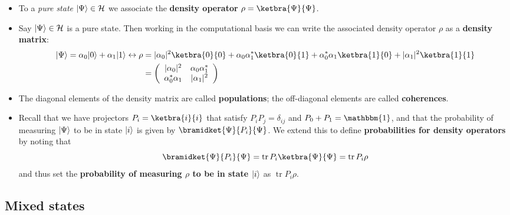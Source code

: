 \documentclass[10pt]{article}
\DeclarePairedDelimiter\ket{\lvert}{\rangle}
\newcommand{\hilb}{\mathcal{H}}
\DeclareMathOperator{\tr}{tr}
\begin{document}
            \begin{itemize}
                \item To a \emph{pure state} $\ket{\Psi}\in\hilb$ we associate the \textbf{density operator} $\rho=\ketbra{\Psi}{\Psi}$.
                \item Say $\ket{\Psi}\in\hilb$ is a pure state.
                    Then working in the computational basis we can write the associated density operator $\rho$ as a \textbf{density matrix}:
                    \begin{align*}
                        \ket{\Psi} = \alpha_0\ket{0}+\alpha_1\ket{1} \leftrightarrow \rho &= |\alpha_0|^2\ketbra{0}{0} + \alpha_0\alpha_1^*\ketbra{0}{1} + \alpha_0^*\alpha_1\ketbra{1}{0} + |\alpha_1|^2\ketbra{1}{1}\\
                        &= \left(
                        \begin{array}{cc}
                            |\alpha_0|^2 & \alpha_0\alpha_1^*\\
                            \alpha_0^*\alpha_1 & |\alpha_1|^2
                        \end{array}
                        \right)
                    \end{align*}
                \item The diagonal elements of the density matrix are called \textbf{populations}; the off-diagonal elements are called \textbf{coherences}.
                \item Recall that we have projectors $P_i=\ketbra{i}{i}$ that satisfy $P_iP_j=\delta_{ij}$ and $P_0+P_1=\mathbbm{1}$, and that the probability of measuring $\ket{\Psi}$ to be in state $\ket{i}$ is given by $\bramidket{\Psi}{P_i}{\Psi}$.
                    We extend this to define \textbf{probabilities for density operators} by noting that
                    \begin{equation*}
                        \bramidket{\Psi}{P_i}{\Psi}=\tr P_i\ketbra{\Psi}{\Psi}=\tr P_i\rho
                    \end{equation*}
                    and thus set the \textbf{probability of measuring $\rho$ to be in state $\ket{i}$} as $\tr P_i\rho$.

            \end{itemize}

        \subsection{Mixed states}
\end{document}
